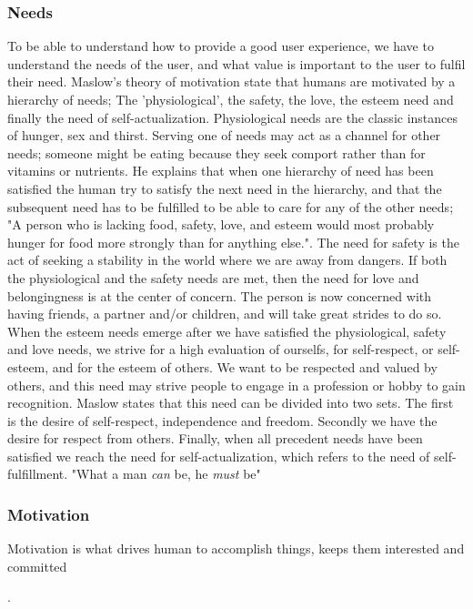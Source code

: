 \subsubsection{Needs}
To be able to understand how to provide a good user experience, we have to understand the needs of the user, and what value is important to the user to fulfil their need. Maslow’s theory of motivation \cite{Maslow1943} state that humans are motivated by a hierarchy of needs; The 'physiological', the safety, the love, the esteem need and finally the need of self-actualization. Physiological needs are the classic instances of hunger, sex and thirst. Serving one of needs may act as a channel for other needs; someone might be eating because they seek comport rather than for vitamins or nutrients. He explains that when one hierarchy of need has been satisfied the human try to satisfy the next need in the hierarchy, and that the subsequent need has to be fulfilled to be able to care for any of the other needs; "A person who is lacking food, safety, love, and esteem would most probably hunger for food more strongly than for anything else.". The need for safety is the act of seeking a stability in the world where we are away from dangers. If both the physiological and the safety needs are met, then the need for love and belongingness is at the center of concern. The person is now concerned with having friends, a partner and/or children, and will take great strides to do so. When the esteem needs emerge after we have satisfied the physiological, safety and love needs, we strive for a high evaluation of ourselfs, for self-respect, or self-esteem, and for the esteem of others. We want to be respected and valued by others, and this need may strive people to engage in a profession or hobby to gain recognition. Maslow states that this need can be divided into two sets. The first is the desire of self-respect, independence and freedom. Secondly we have the desire for respect from others. Finally, when all precedent needs have been satisfied we reach the need for self-actualization, which refers to the need of self-fulfillment. "What a man \textit{can} be, he \textit{must} be"


\subsubsection{Motivation}

Motivation is what drives human to accomplish things, keeps them interested and committed .

